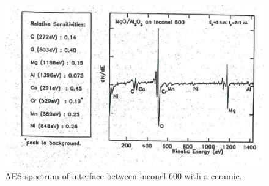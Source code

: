 \begin{enumerate}
\begin{figure}[h!]
	\begin{center}
	\includegraphics[scale=4]{figures/06_18.png}
	\caption{AES spectrum of interface between inconel 600 with a ceramic.}
	\label{fig:aesinconel}
	\end{center}
\end{figure}
\end{enumerate}
